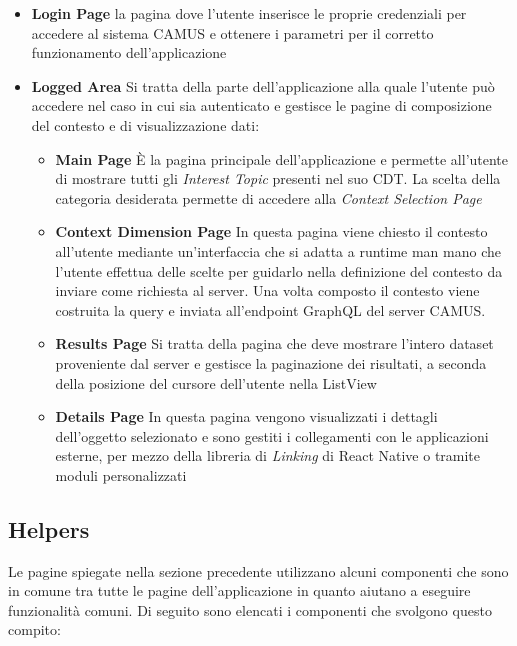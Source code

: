 \begin{itemize}
	\item \textbf{Login Page} \upe la pagina dove l'utente inserisce le proprie credenziali per accedere al sistema CAMUS e ottenere i parametri per il corretto funzionamento dell'applicazione
	\item \textbf{Logged Area} Si tratta della parte dell'applicazione alla quale l'utente può accedere nel caso in cui sia autenticato e gestisce le pagine di composizione del contesto e di visualizzazione dati:
	\begin{itemize}
		\item \textbf{Main Page} È la pagina principale dell'applicazione e permette all'utente di mostrare tutti gli \emph{Interest Topic} presenti nel suo CDT. La scelta della categoria desiderata permette di accedere alla \emph{Context Selection Page}
		\item \textbf{Context Dimension Page} In questa pagina viene chiesto il contesto all'utente mediante un'interfaccia che si adatta a runtime man mano che l'utente effettua delle scelte per guidarlo nella definizione del contesto da inviare come richiesta al server. Una volta composto il contesto viene costruita la query e inviata all'endpoint GraphQL del server CAMUS. 
		\item \textbf{Results Page} Si tratta della pagina che deve mostrare l'intero dataset proveniente dal server e gestisce la paginazione dei risultati, a seconda della posizione del cursore dell'utente nella ListView 
		\item \textbf{Details Page} In questa pagina vengono visualizzati i dettagli dell'oggetto selezionato e sono gestiti i collegamenti con le applicazioni esterne, per mezzo della libreria di \emph{Linking} di React Native o tramite moduli personalizzati
	\end{itemize}
\end{itemize}

\subsection{Helpers}
Le pagine spiegate nella sezione precedente utilizzano alcuni componenti che sono in comune tra tutte le pagine dell'applicazione in quanto aiutano a eseguire funzionalità comuni. Di seguito sono elencati i componenti che svolgono questo compito:

